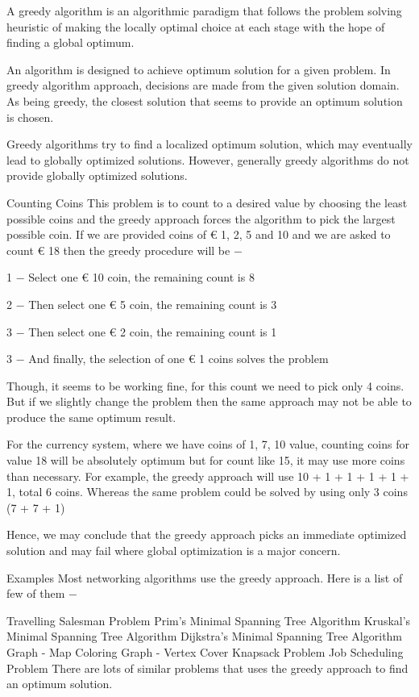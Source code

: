 A greedy algorithm is an algorithmic paradigm that follows the 
problem solving heuristic of making the locally optimal choice 
at each stage with the hope of finding a global optimum.


An algorithm is designed to achieve optimum solution for a given problem. In greedy algorithm approach, decisions are made from the given solution domain. As being greedy, the closest solution that seems to provide an optimum solution is chosen.

Greedy algorithms try to find a localized optimum solution, which may eventually lead to globally optimized solutions. However, generally greedy algorithms do not provide globally optimized solutions.

Counting Coins
This problem is to count to a desired value by choosing the least possible coins and the greedy approach forces the algorithm to pick the largest possible coin. If we are provided coins of € 1, 2, 5 and 10 and we are asked to count € 18 then the greedy procedure will be −

1 − Select one € 10 coin, the remaining count is 8

2 − Then select one € 5 coin, the remaining count is 3

3 − Then select one € 2 coin, the remaining count is 1

3 − And finally, the selection of one € 1 coins solves the problem

Though, it seems to be working fine, for this count we need to pick only 4 coins. But if we slightly change the problem then the same approach may not be able to produce the same optimum result.

For the currency system, where we have coins of 1, 7, 10 value, counting coins for value 18 will be absolutely optimum but for count like 15, it may use more coins than necessary. For example, the greedy approach will use 10 + 1 + 1 + 1 + 1 + 1, total 6 coins. Whereas the same problem could be solved by using only 3 coins (7 + 7 + 1)

Hence, we may conclude that the greedy approach picks an immediate optimized solution and may fail where global optimization is a major concern.

Examples
Most networking algorithms use the greedy approach. Here is a list of few of them −

Travelling Salesman Problem
Prim's Minimal Spanning Tree Algorithm
Kruskal's Minimal Spanning Tree Algorithm
Dijkstra's Minimal Spanning Tree Algorithm
Graph - Map Coloring
Graph - Vertex Cover
Knapsack Problem
Job Scheduling Problem
There are lots of similar problems that uses the greedy approach to find an optimum solution.

